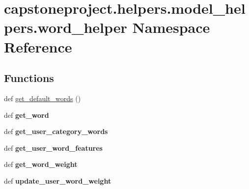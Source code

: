 \hypertarget{namespacecapstoneproject_1_1helpers_1_1model__helpers_1_1word__helper}{}\section{capstoneproject.\+helpers.\+model\+\_\+helpers.\+word\+\_\+helper Namespace Reference}
\label{namespacecapstoneproject_1_1helpers_1_1model__helpers_1_1word__helper}
\subsection*{Functions}
\begin{DoxyCompactItemize}
\item 
def \mbox{\hyperlink{namespacecapstoneproject_1_1helpers_1_1model__helpers_1_1word__helper_a973e709c58f456c247d624506934abbe}{get\+\_\+default\+\_\+words}} ()
\item 
\mbox{\label{namespacecapstoneproject_1_1helpers_1_1model__helpers_1_1word__helper_aa048714411c3a2d6108c72b45ddb81d5}} 
def {\bfseries get\+\_\+word}
\item 
\mbox{\label{namespacecapstoneproject_1_1helpers_1_1model__helpers_1_1word__helper_a388528e2ac21168cb385db8744dd43f2}} 
def {\bfseries get\+\_\+user\+\_\+category\+\_\+words}
\item 
\mbox{\label{namespacecapstoneproject_1_1helpers_1_1model__helpers_1_1word__helper_afd52af0b0008ae3530f87c316051d8fb}} 
def {\bfseries get\+\_\+user\+\_\+word\+\_\+features}
\item 
\mbox{\label{namespacecapstoneproject_1_1helpers_1_1model__helpers_1_1word__helper_af99415bed21563587b8a9dcd2f160b5d}} 
def {\bfseries get\+\_\+word\+\_\+weight}
\item 
\mbox{\label{namespacecapstoneproject_1_1helpers_1_1model__helpers_1_1word__helper_a358dfe59412ae03e13c01d34a5d6a8a4}} 
def {\bfseries update\+\_\+user\+\_\+word\+\_\+weight}
\end{DoxyCompactItemize}


